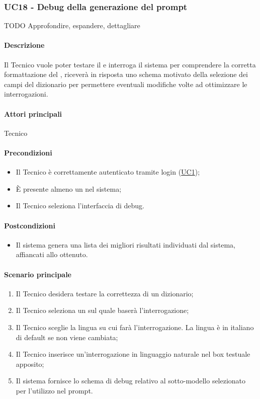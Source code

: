 \subsubsection{UC18 - Debug della generazione del prompt}\label{UC18}
TODO Approfondire, espandere, dettagliare
\paragraph*{Descrizione}
Il Tecnico vuole poter testare il  e interroga il sistema per comprendere la corretta formattazione del , riceverà in risposta uno schema motivato della selezione dei campi del dizionario per permettere eventuali modifiche volte ad ottimizzare le interrogazioni.

\paragraph*{Attori principali}
Tecnico

\paragraph*{Precondizioni}
\begin{itemize}
  \item Il Tecnico è correttamente autenticato tramite login (\hyperref[UC1]{UC1});
  \item È presente almeno un  nel sistema;
  \item Il Tecnico seleziona l’interfaccia di debug.
\end{itemize}

\paragraph*{Postcondizioni}
\begin{itemize}
  \item Il sistema genera una lista dei migliori risultati individuati dal sistema, affiancati allo  ottenuto.
\end{itemize}

\paragraph*{Scenario principale}
\begin{enumerate}
  \item Il Tecnico desidera testare la correttezza di un dizionario; 
  \item Il Tecnico seleziona un  sul quale baserà l’interrogazione;
  \item Il Tecnico sceglie la lingua su cui farà l’interrogazione. La lingua è in italiano di default se non viene cambiata;
  \item Il Tecnico inserisce un’interrogazione in linguaggio naturale nel box testuale apposito;
  \item Il sistema fornisce lo schema di debug relativo al sotto-modello selezionato per l’utilizzo nel prompt.  
\end{enumerate}

